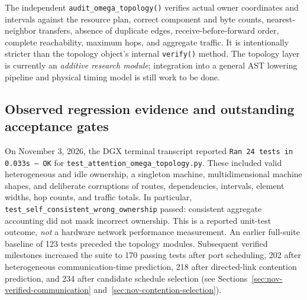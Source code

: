 \documentclass[11pt]{article}
\begin{document}
The independent \texttt{audit\_omega\_topology()} verifies actual owner
coordinates and intervals against the resource plan, correct component and
byte counts, nearest-neighbor transfers, absence of duplicate edges,
receive-before-forward order, complete reachability, maximum hops, and
aggregate traffic. It is intentionally stricter than the topology object's
internal \texttt{verify()} method. The topology layer is currently an
\emph{additive research module}; integration into a general AST lowering
pipeline and physical timing model is still work to be done.

\subsection{Observed regression evidence and outstanding acceptance gates}
On November 3, 2026, the DGX terminal transcript reported
\texttt{Ran 24 tests in 0.033s --- OK} for
\texttt{test\_attention\_omega\_topology.py}. These included valid
heterogeneous and idle ownership, a singleton machine, multidimensional
machine shapes, and deliberate corruptions of routes, dependencies,
intervals, element widths, hop counts, and traffic totals. In particular,
\texttt{test\_self\_consistent\_wrong\_ownership} passed: consistent
aggregate accounting did not mask incorrect ownership. This is a reported
unit-test outcome, \emph{not} a hardware network performance measurement.
An earlier full-suite baseline of 123 tests preceded the topology modules.
Subsequent verified milestones increased the suite to 170 passing tests after
port scheduling, 202 after heterogeneous communication-time prediction,
218 after directed-link contention prediction, and 234 after candidate
schedule selection (see Sections~\ref{sec:nov-verified-communication}
and~\ref{sec:nov-contention-selection}).
\end{document}
